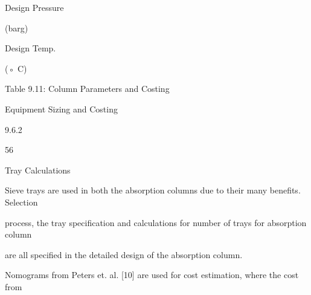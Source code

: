 \documentclass[a4paper,portrait,12pt]{article}
\begin{document}
\begin{flushleft}
Design Pressure
\end{flushleft}


\begin{flushleft}
(barg)
\end{flushleft}


\begin{flushleft}
Design Temp.
\end{flushleft}


\begin{flushleft}
(◦ C)
\end{flushleft}





\begin{flushleft}
Table 9.11: Column Parameters and Costing
\end{flushleft}





\begin{flushleft}
\newpage
Equipment Sizing and Costing
\end{flushleft}





9.6.2





56





\begin{flushleft}
Tray Calculations
\end{flushleft}





\begin{flushleft}
Sieve trays are used in both the absorption columns due to their many benefits. Selection
\end{flushleft}


\begin{flushleft}
process, the tray specification and calculations for number of trays for absorption column
\end{flushleft}


\begin{flushleft}
are all specified in the detailed design of the absorption column.
\end{flushleft}


\begin{flushleft}
Nomograms from Peters et. al. [10] are used for cost estimation, where the cost from
\end{flushleft}
\end{document}
